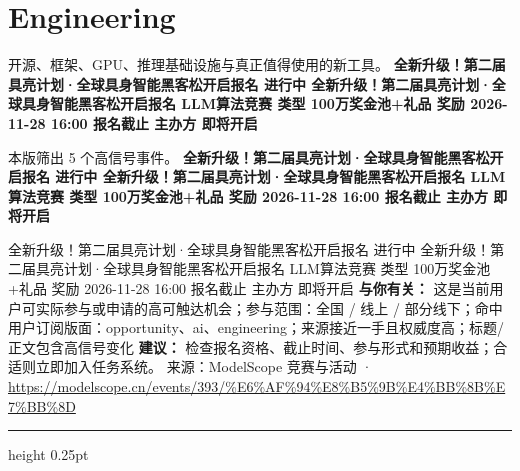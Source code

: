 \documentclass[10.5pt]{ctexart}
\begin{document}
\section*{Engineering}
{\color{ormuted} 开源、框架、GPU、推理基础设施与真正值得使用的新工具。}
\vspace{2mm}
{\LARGE\bfseries 全新升级！第二届具亮计划·全球具身智能黑客松开启报名 进行中 全新升级！第二届具亮计划·全球具身智能黑客松开启报名 LLM算法竞赛 类型 100万奖金池+礼品 奖励 2026-11-28 16:00 报名截止 主办方 即将开启}\par
\vspace{1mm}
{\color{ormuted} 本版筛出 5 个高信号事件。}
\vspace{3mm}
{\Large\bfseries 全新升级！第二届具亮计划·全球具身智能黑客松开启报名 进行中 全新升级！第二届具亮计划·全球具身智能黑客松开启报名 LLM算法竞赛 类型 100万奖金池+礼品 奖励 2026-11-28 16:00 报名截止 主办方 即将开启}\par
全新升级！第二届具亮计划·全球具身智能黑客松开启报名 进行中 全新升级！第二届具亮计划·全球具身智能黑客松开启报名 LLM算法竞赛 类型 100万奖金池+礼品 奖励 2026-11-28 16:00 报名截止 主办方 即将开启
\textbf{与你有关：} 这是当前用户可实际参与或申请的高可触达机会；参与范围：全国 / 线上 / 部分线下；命中用户订阅版面：opportunity、ai、engineering；来源接近一手且权威度高；标题/正文包含高信号变化
\textbf{建议：} 检查报名资格、截止时间、参与形式和预期收益；合适则立即加入任务系统。
{\footnotesize\color{ormuted} 来源：ModelScope 竞赛与活动 · \url{https://modelscope.cn/events/393/%E6%AF%94%E8%B5%9B%E4%BB%8B%E7%BB%8D}}
\vspace{4mm}
\hrule height 0.25pt
\vspace{3mm}
\end{document}
